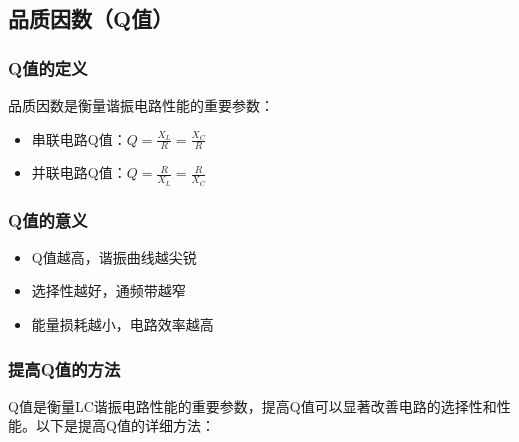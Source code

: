 \documentclass[12pt,UTF8]{ctexbook}
\begin{document}
\subsection{品质因数（Q值）}

\subsubsection{Q值的定义}

品质因数是衡量谐振电路性能的重要参数：

\begin{itemize}[leftmargin=3.5em]
    \item 串联电路Q值：$Q = \frac{X_L}{R} = \frac{X_C}{R}$
    \item 并联电路Q值：$Q = \frac{R}{X_L} = \frac{R}{X_C}$
\end{itemize}

\subsubsection{Q值的意义}

\begin{itemize}[leftmargin=3.5em]
    \item Q值越高，谐振曲线越尖锐
    \item 选择性越好，通频带越窄
    \item 能量损耗越小，电路效率越高
\end{itemize}

\subsubsection{提高Q值的方法}

Q值是衡量LC谐振电路性能的重要参数，提高Q值可以显著改善电路的选择性和性能。以下是提高Q值的详细方法：
\end{document}
